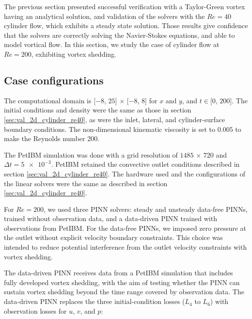 
The previous section presented successful verification with a Taylor-Green vortex having an analytical solution, and validation of the solvers with the $Re=40$ cylinder flow, which exhibits a steady state solution.
Those results give confidence that the solvers are correctly solving the Navier-Stokes equations, and able to model vortical flow. In this section, we study the case of cylinder flow at $Re=200$, exhibiting vortex shedding.

\subsection{Case configurations}

The computational domain is $[-8$, $25]$ $\times$ $[-8$, $8]$ for $x$ and $y$, and $t\in[0$, $200]$.
The initial conditions and density were the same as those in section \ref{sec:val_2d_cylinder_re40}, as were the inlet, lateral, and cylinder-surface boundary conditions.
The non-dimensional kinematic viscosity is set to $0.005$ to make the Reynolds number $200$.

The PetIBM simulation was done with a grid resolution of $1485$ $\times$ $720$ and $\Delta t = \num{5e-3}$.
PetIBM retained the convective outlet conditions described in section \ref{sec:val_2d_cylinder_re40}.
The hardware used and the configurations of the linear solvers were the same as described in section \ref{sec:val_2d_cylinder_re40}.

For $Re=200$, we used three PINN solvers: steady and unsteady data-free PINNs, trained without observation data, and a data-driven PINN trained with observations from PetIBM.
For the data-free PINNs, we imposed zero pressure at the outlet without explicit velocity boundary constraints.
This choice was intended to reduce potential interference from the outlet velocity constraints with vortex shedding.

The data-driven PINN receives data from a PetIBM simulation that includes fully developed vortex shedding, with the aim of testing whether the PINN can sustain vortex shedding beyond the time range covered by observation data.
The data-driven PINN replaces the three initial-condition losses ($L_4$ to $L_6$) with observation losses for $u$, $v$, and $p$:

